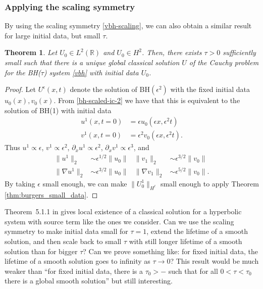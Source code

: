 \documentclass{article}
\theoremstyle{plain}
\newtheorem{theorem}{Theorem}
\theoremstyle{definition}
\numberwithin{theorem}{section}
\newcommand{\todo}[1]{{\Large{\color{red}{#1}}}}
\begin{document}
\subsubsection{Applying the scaling symmetry}
By using the scaling symmetry \eqref{vbh-scaling}, we can also obtain a similar result for large initial data, but small $\tau$.
\begin{theorem}
\label{thm:bh_small_tau}
    Let
    $U_0 \in L^2(\mathbb{R})$ and
    $U_0 \in H^2$.
    Then, there exists $\tau > 0$ sufficiently small such that
    there is a unique global classical solution $U$ of the Cauchy problem for the BH($\tau$) system \eqref{vbh}
    with initial data $U_0$.
\end{theorem}
\begin{proof}
    Let $U^\epsilon(x,t)$ denote the solution of
    BH$(\epsilon^2)$ with the fixed initial data $u_0(x),v_0(x)$.  From \eqref{bh-scaled-ic-2}
    we have that this is equivalent to the solution of BH(1) with initial data
    \begin{align*}
        u^1(x,t=0) & = \epsilon u_0(\epsilon x, \epsilon^2 t) \\
        v^1(x,t=0) & = \epsilon^2 v_0(\epsilon x, \epsilon^2 t).
    \end{align*}
    Thus $u^1 \propto \epsilon$, $v^1\propto \epsilon^2$, $\partial_x u^1 \propto \epsilon^2$,
    $\partial_x v^1 \propto \epsilon^3$, and
    \begin{align*}
        \|u^1\|_2 & \sim \epsilon^{1/2} \|u_0\| & \|v_1\|_2 & \sim \epsilon^{3/2} \|v_0\| \\
        \|\nabla u^1\|_2 & \sim \epsilon^{3/2} \|u_0\| & \|\nabla v_1\|_2 & \sim \epsilon^{5/2}\|v_0\| .
    \end{align*}
    By taking $\epsilon$ small enough, 
    we can make $\|U^1_0\|_{H^\ell}$ small enough to apply Theorem \ref{thm:burgers_small_data}.
\end{proof}



\todo{TODO: Another kind of regularity result?}
Theorem~5.1.1 in \cite{dafermos2016hyperbolic} gives local existence of a classical solution for a hyperbolic system with source term like the ones we consider.
Can we use the scaling symmetry to make initial data small for $\tau = 1$, extend the lifetime of a smooth solution, and then scale back to small $\tau$ with still longer lifetime of a smooth solution than for bigger $\tau$?
Can we prove something like: for fixed initial data, the lifetime of a smooth solution goes to infinity as $\tau \to 0$?
This result would be much weaker than ``for fixed initial data, there is a $\tau_0 > -$ such that for all $0 < \tau <  \tau_0$ there is a global smooth solution'' but still interesting.
\end{document}
